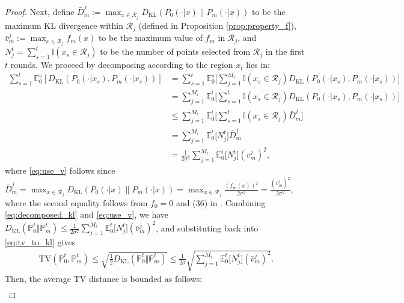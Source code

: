 \documentclass[10pt]{article}
\begin{document}
\begin{proof}
    Next, define $\bar{D}^j_m := \max_{x \in \mathcal{R}_j} D_{\mathrm{KL}}( P_0(\cdot|x) \| P_m(\cdot|x) )$ to be the maximum KL divergence within $\mathcal{R}_j$ (defined in Proposition \ref{prop:property_f}), $\bar{v}^j_m := \max_{x \in \mathcal{R}_j} f_m(x) $ to be the maximum value of $f_{m}$ in $\mathcal{R}_j$, and $N_j^t = \sum_{s=1}^t \mathbb{I}(x_s\in\mathcal{R}_j) $ to be the number of points selected from $\mathcal{R}_j$ in the first $t$ rounds.
    We proceed by decomposing according to the region $x_t$ lies in:
    \begin{align}
        \sum_{s=1}^{t} \mathbb{E}_0^s\left[ D_{\mathrm{KL}}\left(P_0(\cdot|x_s), P_m(\cdot|x_s)\right) \right]
        & = \sum_{s=1}^{t} \mathbb{E}_0^s\biggl[ \sum_{j=1}^{M_i}\mathbb{I}(x_s\in\mathcal{R}_j) D_{\mathrm{KL}}\left(P_0(\cdot|x_s), P_m(\cdot|x_s)\right) \biggr] \\
        & = \sum_{j=1}^{M_i} \mathbb{E}_0^{t}\biggl[ \sum_{s=1}^{t} \mathbb{I}(x_s\in\mathcal{R}_j) D_{\mathrm{KL}}\left(P_0(\cdot|x_s), P_m(\cdot|x_s)\right) \biggr] \\
        & \leq \sum_{j=1}^{M_i} \mathbb{E}_0^{t}\biggl[ \sum_{s=1}^{t} \mathbb{I}(x_s\in\mathcal{R}_j) \bar{D}^j_m \biggr] \\
        & = \sum_{j=1}^{M_i} \mathbb{E}_0^{t}\bigl[ N^{t}_j \bigr] \bar{D}^j_m \\
        & = \frac{1}{2\sigma^2}\sum_{j=1}^{M_i} \mathbb{E}_0^{t}\bigl[ N^{t}_j \bigr] (\bar{v}^j_m)^2, \label{eq:use_v}
    \end{align}
    where \eqref{eq:use_v} follows since $\bar{D}^j_m = \max_{x \in \mathcal{R}_j} D_{\mathrm{KL}}( P_0(\cdot|x) \| P_m(\cdot|x) )= \max_{x \in \mathcal{R}_j} \frac{(f_m(x))^2}{2\sigma^2} = \frac{(\bar{v}^j_m)^2}{2\sigma^2} $, where the second equality follows from $f_0 = 0$ and (36) in \citep{Scarlett17}.
    Combining \eqref{eq:decomposed_kl} and \eqref{eq:use_v}, we have $D_{\mathrm{KL}}(\mathbb{P}_0^{t}\Vert \mathbb{P}_m^{t}) \leq \frac{1}{2\sigma^2}\sum_{j=1}^{M_i} \mathbb{E}_0^{t}\bigl[ N^{t}_j \bigr] (\bar{v}^j_m)^2$, and substituting back into \eqref{eq:tv_to_kl} gives
    \begin{align}
        \mathrm{TV}(\mathbb{P}_0^{t}, \mathbb{P}_m^{t}) 
        \leq \sqrt{\frac{1}{2}D_{\mathrm{KL}}(\mathbb{P}_0^{t}\Vert \mathbb{P}_m^{t})}
        \leq \frac{1}{2\sigma}\sqrt{\sum_{j=1}^{M_i} \mathbb{E}_0^{t}\bigl[ N^{t}_j \bigr] (\bar{v}^j_m)^2}.
    \end{align}
    Then, the average TV distance is bounded as follows:
    \begin{align}

\end{align}
\end{proof}
\end{document}
